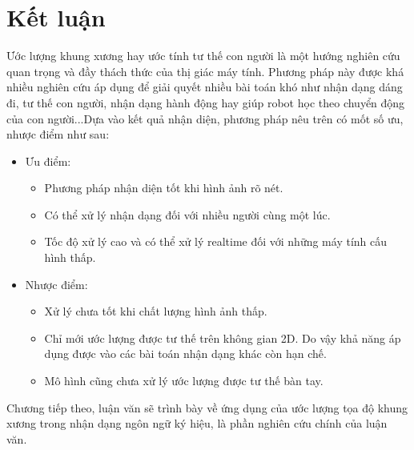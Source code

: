 \section{Kết luận}
Ước lượng khung xương hay ước tính tư thế con người là một hướng nghiên cứu quan trọng và đầy thách thức của thị giác máy tính. Phương pháp này được khá nhiều nghiên cứu áp dụng để giải quyết nhiều bài toán khó như nhận dạng dáng đi, tư thế con người, nhận dạng hành động hay giúp robot học theo chuyển động của con người...Dựa vào kết quả nhận diện, phương pháp nêu trên có mốt số ưu, nhược điểm như sau:
\begin{itemize}
\item Ưu điểm:
	\begin{itemize}
	\item Phương pháp nhận diện tốt khi hình ảnh rõ nét.
	\item Có thể xử lý nhận dạng đối với nhiều người cùng một lúc.
	\item Tốc độ xử lý cao và có thể xử lý realtime đối với những máy tính cấu hình thấp.
	\end{itemize}
\item Nhược điểm:
	\begin{itemize}
	\item Xử lý chưa tốt khi chất lượng hình ảnh thấp.
	\item Chỉ mới ước lượng được tư thế trên không gian 2D. Do vậy khả năng áp dụng được vào các bài toán nhận dạng khác còn hạn chế.
	\item Mô hình cũng chưa xử lý ước lượng được tư thế bàn tay.
	\end{itemize}
\end{itemize}
Chương tiếp theo, luận văn sẽ trình bày về ứng dụng của ước lượng tọa độ khung xương trong nhận dạng ngôn ngữ ký hiệu, là phần nghiên cứu chính của luận văn.